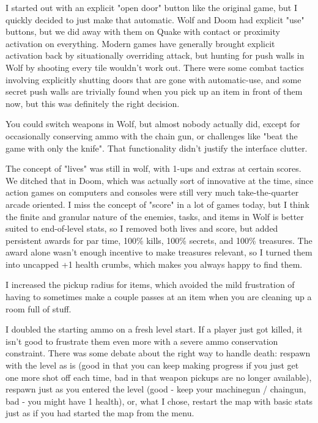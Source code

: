 I started out with an explicit "open door" button like the original game, but I quickly decided to just make that automatic.  Wolf and Doom had explicit "use" buttons, but we did away with them on Quake with contact or proximity activation on everything.  Modern games have generally brought explicit activation back by situationally overriding attack, but hunting for push walls in Wolf by shooting every tile wouldn't work out.  There were some combat tactics involving explicitly shutting doors that are gone with automatic-use, and some secret push walls are trivially found when you pick up an item in front of them now, but this was definitely the right decision.\\
\par

You could switch weapons in Wolf, but almost nobody actually did, except for occasionally conserving ammo with the chain gun, or challenges like "beat the game with only the knife".  That functionality didn't justify the interface clutter.\\
\par

The concept of "lives" was still in wolf, with 1-ups and extras at certain scores.  We ditched that in Doom, which was actually sort of innovative at the time, since action games on computers and consoles were still very much take-the-quarter arcade oriented.  I miss the concept of "score" in a lot of games today, but I think the finite and granular nature of the enemies, tasks, and items in Wolf is better suited to end-of-level stats, so I removed both lives and score, but added persistent awards for par time, 100\% kills, 100\% secrets, and 100\% treasures.  The award alone wasn't enough incentive to make treasures relevant, so I turned them into uncapped +1 health crumbs, which makes you always happy to find them.\\
\par

I increased the pickup radius for items, which avoided the mild frustration of having to sometimes make a couple passes at an item when you are cleaning up a room full of stuff.\\
\par

I doubled the starting ammo on a fresh level start.  If a player just got killed, it isn't good to frustrate them even more with a severe ammo conservation constraint.  There was some debate about the right way to handle death:  respawn with the level as is (good in that you can keep making progress if you just get one more shot off each time, bad in that weapon pickups are no longer available), respawn just as you entered the level (good - keep your machinegun / chaingun, bad - you might have 1 health), or, what I chose, restart the map with basic stats just as if you had started the map from the menu.\\
\par

